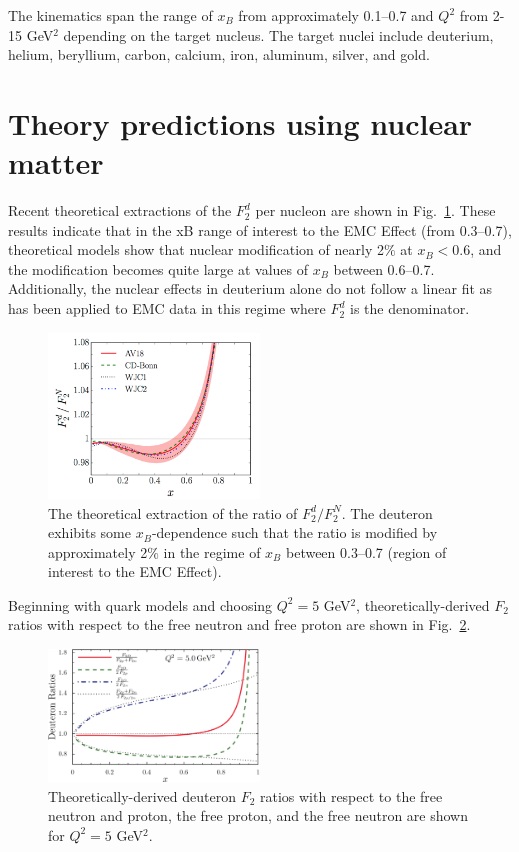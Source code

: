 \documentclass[oneside]{article}
\begin{document}
The kinematics span the range of $x_B$ from approximately 0.1--0.7 and $Q^2$ from 2-15 GeV$^2$ depending on the target nucleus. The target nuclei include deuterium, helium, beryllium, carbon, calcium, iron, aluminum, silver, and gold.  
 
\section{Theory predictions using nuclear matter}

Recent theoretical extractions of the $F_2^d$ per nucleon are shown in Fig.~\ref{fig:dn_theory}. These results indicate that in the xB range of interest to the EMC Effect (from 0.3--0.7), theoretical models show that nuclear modification of nearly 2$\%$ at $x_B<0.6$, and the modification becomes quite large at values of $x_B$ between 0.6--0.7. Additionally, the nuclear effects in deuterium alone do not follow a linear fit as has been applied to EMC data in this regime where $F_2^d$ is the denominator. 

\begin{figure}[H]
  \centering
      	  \includegraphics[width=0.5\textwidth]{plots/dn_effects_theory.png}
 	 \caption[Theoretical extraction of the ratio of $F_2^d/F_2^N$]{The theoretical extraction of the ratio of $F_2^d/F_2^N$. The deuteron exhibits some $x_B$-dependence such that the ratio is modified by approximately 2$\%$ in the regime of $x_B$ between 0.3--0.7 (region of interest to the EMC Effect).}
  \label{fig:dn_theory}
 \end{figure}  
 
Beginning with quark models and choosing $Q^2=5$ GeV$^2$, theoretically-derived $F_2$ ratios with respect to the free neutron and free proton are shown in Fig.~\ref{fig:deut_theory}. 

\begin{figure}[H]
  \centering
      	  \includegraphics[width=0.5\textwidth]{plots/deut_ratio_theory.png}
 	 \caption[Theoretically-derived deuteron $F_2$ ratios with respect to the free nucleons]{Theoretically-derived deuteron $F_2$ ratios with respect to the free neutron and proton, the free proton, and the free neutron are shown for $Q^2=5$ GeV$^2$.}
  \label{fig:deut_theory}
 \end{figure}  
  
\end{document}
